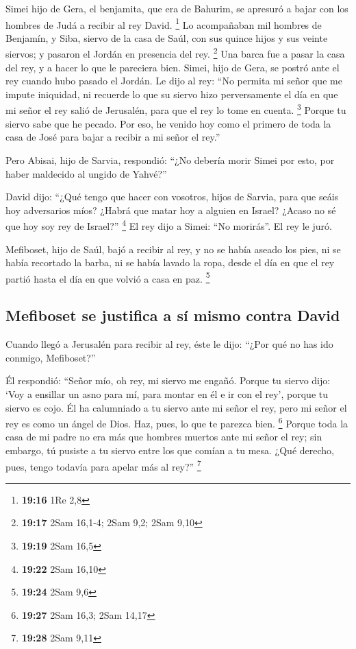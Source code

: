  Simei hijo de Gera, el benjamita, que era de Bahurim, se
apresuró a bajar con los hombres de Judá a recibir al rey David.
\footnote{\textbf{19:16} 1Re 2,8}  Lo acompañaban mil
hombres de Benjamín, y Siba, siervo de la casa de Saúl, con sus quince
hijos y sus veinte siervos; y pasaron el Jordán en presencia del rey.
\footnote{\textbf{19:17} 2Sam 16,1-4; 2Sam 9,2; 2Sam 9,10}
 Una barca fue a pasar la casa del rey, y a hacer lo que
le pareciera bien. Simei, hijo de Gera, se postró ante el rey cuando
hubo pasado el Jordán.  Le dijo al rey: ``No permita mi
señor que me impute iniquidad, ni recuerde lo que su siervo hizo
perversamente el día en que mi señor el rey salió de Jerusalén, para que
el rey lo tome en cuenta. \footnote{\textbf{19:19} 2Sam 16,5}
 Porque tu siervo sabe que he pecado. Por eso, he venido
hoy como el primero de toda la casa de José para bajar a recibir a mi
señor el rey.''

 Pero Abisai, hijo de Sarvia, respondió: ``¿No debería
morir Simei por esto, por haber maldecido al ungido de Yahvé?''

 David dijo: ``¿Qué tengo que hacer con vosotros, hijos
de Sarvia, para que seáis hoy adversarios míos? ¿Habrá que matar hoy a
alguien en Israel? ¿Acaso no sé que hoy soy rey de Israel?'' \footnote{\textbf{19:22}
  2Sam 16,10}  El rey dijo a Simei: ``No morirás''. El
rey le juró.

 Mefiboset, hijo de Saúl, bajó a recibir al rey, y no se
había aseado los pies, ni se había recortado la barba, ni se había
lavado la ropa, desde el día en que el rey partió hasta el día en que
volvió a casa en paz. \footnote{\textbf{19:24} 2Sam 9,6}

\hypertarget{mefiboset-se-justifica-a-suxed-mismo-contra-david}{%
\subsection{Mefiboset se justifica a sí mismo contra
David}\label{mefiboset-se-justifica-a-suxed-mismo-contra-david}}

 Cuando llegó a Jerusalén para recibir al rey, éste le
dijo: ``¿Por qué no has ido conmigo, Mefiboset?''

 Él respondió: ``Señor mío, oh rey, mi siervo me engañó.
Porque tu siervo dijo: `Voy a ensillar un asno para mí, para montar en
él e ir con el rey', porque tu siervo es cojo.  Él ha
calumniado a tu siervo ante mi señor el rey, pero mi señor el rey es
como un ángel de Dios. Haz, pues, lo que te parezca bien. \footnote{\textbf{19:27}
  2Sam 16,3; 2Sam 14,17}  Porque toda la casa de mi padre
no era más que hombres muertos ante mi señor el rey; sin embargo, tú
pusiste a tu siervo entre los que comían a tu mesa. ¿Qué derecho, pues,
tengo todavía para apelar más al rey?'' \footnote{\textbf{19:28} 2Sam
  9,11}

